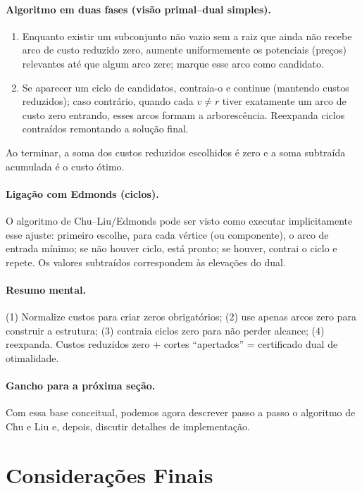 \documentclass[12pt,a4paper]{article}
\begin{document}
\paragraph{Algoritmo em duas fases (visão primal–dual simples).}
\begin{enumerate}\setlength{\itemsep}{3pt}
    \item Enquanto existir um subconjunto não vazio sem a raiz que ainda não recebe arco de custo reduzido zero, aumente uniformemente os potenciais (preços) relevantes até que algum arco zere; marque esse arco como candidato.
    \item Se aparecer um ciclo de candidatos, contraia-o e continue (mantendo custos reduzidos); caso contrário, quando cada $v\neq r$ tiver exatamente um arco de custo zero entrando, esses arcos formam a arborescência. Reexpanda ciclos contraídos remontando a solução final.
\end{enumerate}
Ao terminar, a soma dos custos reduzidos escolhidos é zero e a soma subtraída acumulada é o custo ótimo.

\paragraph{Ligação com Edmonds (ciclos).} O algoritmo de Chu--Liu/Edmonds pode ser visto como executar implicitamente esse ajuste: primeiro escolhe, para cada vértice (ou componente), o arco de entrada mínimo; se não houver ciclo, está pronto; se houver, contrai o ciclo e repete. Os valores subtraídos correspondem às elevações do dual.

\paragraph{Resumo mental.} (1) Normalize custos para criar zeros obrigatórios; (2) use apenas arcos zero para construir a estrutura; (3) contraia ciclos zero para não perder alcance; (4) reexpanda. Custos reduzidos zero + cortes “apertados” = certificado dual de otimalidade.

\paragraph{Gancho para a próxima seção.} Com essa base conceitual, podemos agora descrever passo a passo o algoritmo de Chu e Liu e, depois, discutir detalhes de implementação.


\paragraph{}     
\section{Considerações Finais}
\printbibliography
\end{document}
